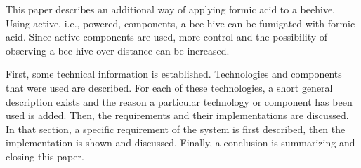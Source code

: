 This paper describes an additional way of applying formic acid to a beehive.
Using active, i.e., powered, components, a bee hive can be fumigated with formic acid.
Since active components are used, more control and the possibility of observing a bee hive over distance can be increased.

First, some technical information is established.
Technologies and components that were used are described.
For each of these technologies, a short general description exists and the reason a particular technology or component has been used is added.
Then, the requirements and their implementations are discussed.
In that section, a specific requirement of the system is first described, then the implementation is shown and discussed.
Finally, a conclusion is summarizing and closing this paper.
